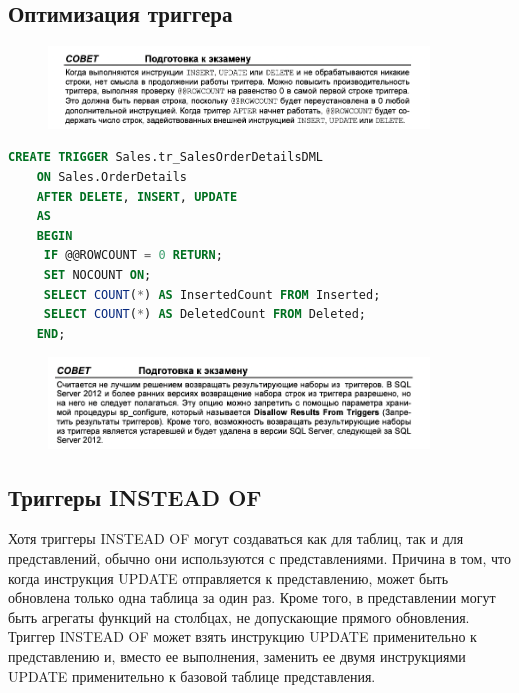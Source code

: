 \subsection{Оптимизация триггера}

\begin{figure}[h!]
	\begin{center}
		\includegraphics[width=0.9\textwidth]{img/advice38.png}
	\end{center}
	\captionsetup{justification=centering}
\end{figure}

\begin{lstlisting}[label=lst:funcReturn, language=sql]
	CREATE TRIGGER Sales.tr_SalesOrderDetailsDML
	ON Sales.OrderDetails
	AFTER DELETE, INSERT, UPDATE
	AS
	BEGIN
	 IF @@ROWCOUNT = 0 RETURN;
	 SET NOCOUNT ON;
	 SELECT COUNT(*) AS InsertedCount FROM Inserted;
	 SELECT COUNT(*) AS DeletedCount FROM Deleted;
	END;
\end{lstlisting}


\begin{figure}[h!]
	\begin{center}
		\includegraphics[width=0.9\textwidth]{img/advice39.png}
	\end{center}
	\captionsetup{justification=centering}
\end{figure}


\subsection{Триггеры INSTEAD OF}
Хотя триггеры INSTEAD OF могут создаваться как для таблиц, так и для представлений, обычно они используются с представлениями. Причина в том, что когда инструкция UPDATE отправляется к представлению, может быть обновлена только одна
таблица за один раз. Кроме того, в представлении могут быть агрегаты функций на
столбцах, не допускающие прямого обновления. Триггер INSTEAD OF может взять
инструкцию UPDATE применительно к представлению и, вместо ее выполнения, заменить ее двумя инструкциями UPDATE применительно к базовой таблице представления.


